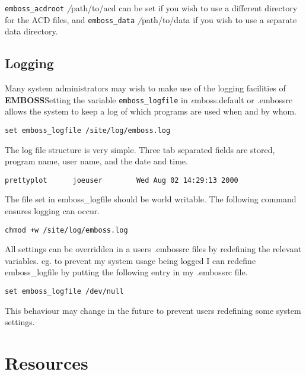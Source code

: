 \documentclass{report}
\newcommand{\ilcomm}[1]{{\tt #1}}
\newcommand{\filename}[1]{{\sf\textsl #1}}
\newcommand{\EMBOSS}{{\sf\bfseries EMBOSS}}
\begin{document}
\ilcomm{emboss\_acdroot} \filename{/path/to/acd} can be set if you wish to use a different directory for the ACD files, and \ilcomm{emboss\_data} \filename{/path/to/data} if you wish to use a separate data directory.


\section{Logging}

Many system administrators may wish to make use of the logging facilities of \EMBOSS\. Setting the variable \ilcomm{emboss\_logfile} in \filename{emboss.default} or \filename{.embossrc} allows the system to keep a log of which programs are used when and by whom.
\begin{verbatim}
set emboss_logfile /site/log/emboss.log
\end{verbatim}
The log file structure is very simple. Three tab separated fields are stored, program name, user name, and the date and time.
\begin{verbatim}
prettyplot      joeuser        Wed Aug 02 14:29:13 2000
\end{verbatim}
The file set in emboss\_logfile should be world writable. The following command ensures logging can occur. 
\begin{verbatim}
chmod +w /site/log/emboss.log
\end{verbatim}

All settings can be overridden in a users \filename{.embossrc} files by redefining the relevant variables. eg. to prevent my system usage being logged I can redefine emboss\_logfile by putting the following entry in my \filename{.embossrc} file. 
\begin{verbatim}
set emboss_logfile /dev/null
\end{verbatim}
This behaviour may change in the future to prevent users redefining some system settings.

\chapter{Resources}
\end{document}
